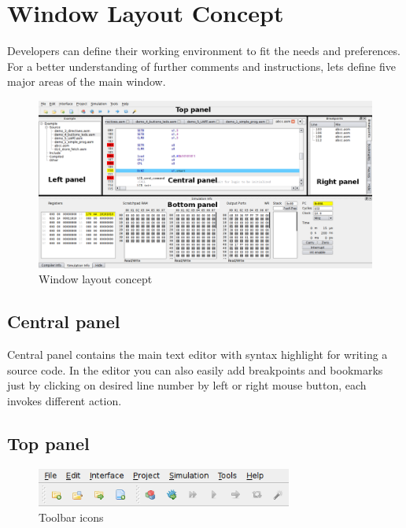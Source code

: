 \section{Window Layout Concept}
    Developers can define their working environment to fit the needs and preferences. For a better understanding of
    further comments and instructions, lets define five major areas of the main window.

   \begin{figure}[h]
        \centering
        \includegraphics[width=\textwidth]{img/Main_window.png}
        \caption{Window layout concept}
    \end{figure}

    \subsection{Central panel}
        Central panel contains the main text editor with syntax highlight for writing a source code. In the editor you can
        also easily add breakpoints and bookmarks just by clicking on desired line number by left or right mouse button,
        each invokes different action.

    \subsection{Top panel}
    \begin{figure}[h!]
            \centering
            \includegraphics[width=0.75\textwidth]{img/top_panel.png}
            \caption{Toolbar icons}
        \end{figure}

